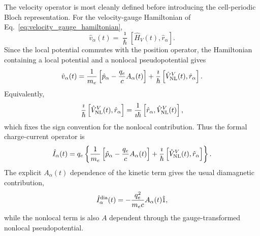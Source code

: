 The velocity operator is most cleanly defined before introducing the
cell-periodic Bloch representation.  For the velocity-gauge Hamiltonian
of Eq.~\eqref{eq:velocity_gauge_hamiltonian},
\begin{equation}
  \hat v_\alpha(t)
  =
  \frac{\imath}{\hbar}
  \left[
    \hat H_V(t),\hat r_\alpha
  \right].
  \label{eq:velocity_commutator_definition}
\end{equation}
Since the local potential commutes with the position operator, the
Hamiltonian containing a local potential and a nonlocal pseudopotential
gives
\begin{equation}
  \hat v_\alpha(t)
  =
  \frac{1}{m_e}
  \left[
    \hat p_\alpha
    -
    \frac{q_e}{c}A_\alpha(t)
  \right]
  +
  \frac{\imath}{\hbar}
  \left[
    \hat V_{\rm NL}^{V}(t),\hat r_\alpha
  \right].
  \label{eq:velocity_operator_full}
\end{equation}
Equivalently,
\begin{equation}
  \frac{\imath}{\hbar}
  \left[
    \hat V_{\rm NL}^{V}(t),\hat r_\alpha
  \right]
  =
  \frac{1}{\imath\hbar}
  \left[
    \hat r_\alpha,\hat V_{\rm NL}^{V}(t)
  \right],
  \label{eq:nlpp_velocity_commutator_equivalence}
\end{equation}
which fixes the sign convention for the nonlocal contribution.  Thus the
formal charge-current operator is
\begin{equation}
  \hat I_\alpha(t)
  =
  q_e
  \left\{
  \frac{1}{m_e}
  \left[
    \hat p_\alpha
    -
    \frac{q_e}{c}A_\alpha(t)
  \right]
  +
  \frac{\imath}{\hbar}
  \left[
    \hat V_{\rm NL}^{V}(t),\hat r_\alpha
  \right]
  \right\}.
  \label{eq:formal_charge_current_operator}
\end{equation}
The explicit $A_\alpha(t)$ dependence of the kinetic term gives the
usual diamagnetic contribution,
\begin{equation}
  \hat I_{\alpha}^{\rm dia}(t)
  =
  -
  \frac{q_e^2}{m_e c}
  A_\alpha(t)\hat 1,
  \label{eq:diamagnetic_current_operator}
\end{equation}
while the nonlocal term is also $A$ dependent through the
gauge-transformed nonlocal pseudopotential.

